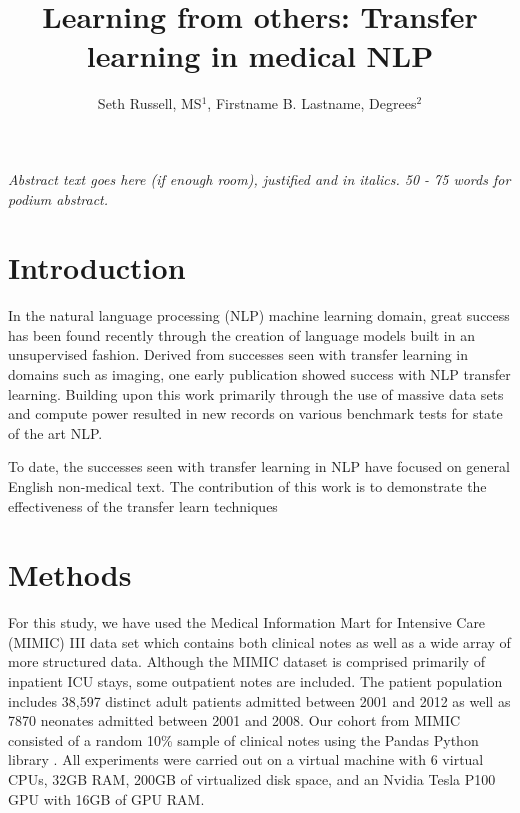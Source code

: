 \documentclass{amia}
\begin{document}
\title{Learning from others: Transfer learning in medical NLP}

\author{Seth Russell, MS$^{1}$, Firstname B. Lastname, Degrees$^{2}$}


\maketitle


\textit{Abstract text goes here (if enough room),  justified and in italics.  50 - 75 words for podium abstract.}

\section*{Introduction}

In the natural language processing (NLP) machine learning domain, great success has been found recently through the creation of language models built in an unsupervised fashion. Derived from successes seen with transfer learning in domains such as imaging, one early publication \cite{howard_universal_2018} showed success with NLP transfer learning. Building upon this work primarily through the use of massive data sets and compute power \cite{radford_improving_2018,radford_language_2019} resulted in new records on various benchmark tests for state of the art NLP.

To date, the successes seen with transfer learning in NLP have focused on general English non-medical text. The contribution of this work is to demonstrate the effectiveness of the transfer learn techniques

\section*{Methods}

For this study, we have used the Medical Information Mart for Intensive Care (MIMIC) III \cite{johnson_mimic-iii_2016} data set which contains both clinical notes as well as a wide array of more structured data. Although the MIMIC dataset is comprised primarily of inpatient ICU stays, some outpatient notes are included. The patient population includes 38,597 distinct adult patients admitted between 2001 and 2012 as well as 7870 neonates admitted between 2001 and 2008. Our cohort from MIMIC consisted of a random 10\% sample of clinical notes using the Pandas Python library \cite{mckinney-proc-scipy-2010}. All experiments were carried out on a virtual machine with 6 virtual CPUs, 32GB RAM, 200GB of virtualized disk space, and an Nvidia Tesla P100 GPU with 16GB of GPU RAM. 
\end{document}
